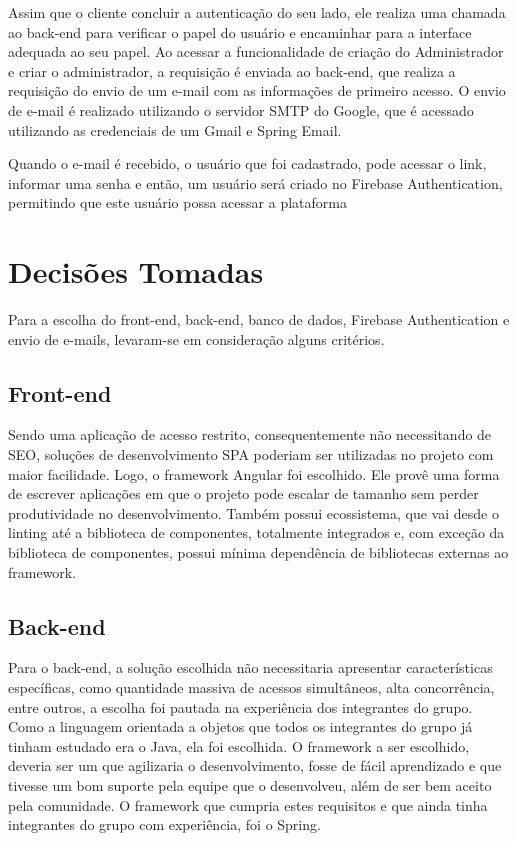 \documentclass[
    12pt,               %
    openright,          %
    oneside,
    a4paper,            %
    english,            %
    brazil              %
    ]{ifsp-spo-inf-ctds} %
\begin{document}
Assim que o cliente concluir a autenticação do seu lado, ele realiza uma chamada ao back-end para verificar o papel do usuário e encaminhar para a interface adequada ao seu papel. Ao acessar a funcionalidade de criação do Administrador e criar o administrador, a requisição é enviada ao back-end, que realiza a requisição do envio de um e-mail com as informações de primeiro acesso. O envio de e-mail é realizado utilizando o servidor SMTP do Google, que é acessado utilizando as credenciais de um Gmail e Spring Email.

Quando o e-mail é recebido, o usuário que foi cadastrado, pode acessar o link, informar uma senha e então, um usuário será criado no Firebase Authentication, permitindo que este usuário possa acessar a plataforma


\chapter[Decisões Tomadas]{Decisões Tomadas}
Para a escolha do front-end, back-end, banco de dados, Firebase Authentication e envio de e-mails, levaram-se em consideração alguns critérios.

\section{Front-end}
Sendo uma aplicação de acesso restrito, consequentemente não necessitando de SEO, soluções de desenvolvimento SPA poderiam ser utilizadas no projeto com maior facilidade. Logo, o framework Angular foi escolhido. Ele provê uma forma de escrever aplicações em que o projeto pode escalar de tamanho sem perder produtividade no desenvolvimento. Também possui ecossistema, que vai desde o linting até a biblioteca de componentes, totalmente integrados e, com exceção da biblioteca de componentes, possui mínima dependência de bibliotecas externas ao framework.

\section{Back-end}
Para o back-end, a solução escolhida não necessitaria apresentar características específicas, como quantidade massiva de acessos simultâneos, alta concorrência, entre outros, a escolha foi pautada na experiência dos integrantes do grupo. Como a linguagem orientada a objetos que todos os integrantes do grupo já tinham estudado era o Java, ela foi escolhida. O framework a ser escolhido, deveria ser um que agilizaria o desenvolvimento, fosse de fácil aprendizado e que tivesse um bom suporte pela equipe que o desenvolveu, além de ser bem aceito pela comunidade. O framework que cumpria estes requisitos e que ainda tinha integrantes do grupo com experiência, foi o Spring.
\end{document}

